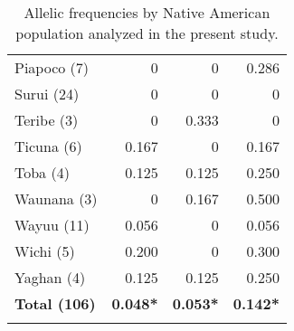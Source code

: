 \begin{table}[!htbp]
\begin{tabularx}{\linewidth}{Xrrr}
Piapoco (7) & 0 & 0 & 0.286 \\
Surui (24) & 0 & 0 & 0 \\
Teribe (3) & 0 & 0.333 & 0 \\
Ticuna (6) & 0.167 & 0 & 0.167 \\
Toba (4) & 0.125 & 0.125 & 0.250 \\
Waunana (3) & 0 & 0.167 & 0.500 \\
Wayuu (11) & 0.056 & 0 & 0.056 \\
Wichi (5) & 0.200 & 0 & 0.300 \\
Yaghan (4) & 0.125 & 0.125 & 0.250 \\
\textbf{Total (106)} & \textbf{0.048*} & \textbf{0.053*} & \textbf{0.142*} \\
\bottomrule
\addlinespace[0.3em]

\multicolumn{4}{l}{\textsuperscript{\textbf{*}} Weighted average}\\
\end{tabularx}

\caption{Allelic frequencies by Native American population analyzed in the present study.}
\label{tab:SciRep_tableS2}

\end{table}